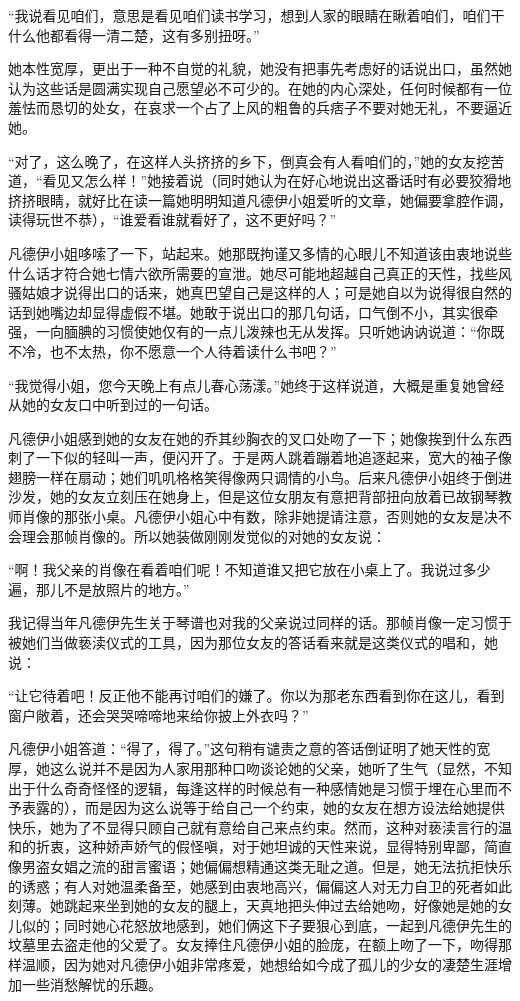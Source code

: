 \par “我说看见咱们，意思是看见咱们读书学习，想到人家的眼睛在瞅着咱们，咱们干什么他都看得一清二楚，这有多别扭呀。”
\par 她本性宽厚，更出于一种不自觉的礼貌，她没有把事先考虑好的话说出口，虽然她认为这些话是圆满实现自己愿望必不可少的。在她的内心深处，任何时候都有一位羞怯而恳切的处女，在哀求一个占了上风的粗鲁的兵痞子不要对她无礼，不要逼近她。
\par “对了，这么晚了，在这样人头挤挤的乡下，倒真会有人看咱们的，”她的女友挖苦道，“看见又怎么样！”她接着说（同时她认为在好心地说出这番话时有必要狡猾地挤挤眼睛，就好比在读一篇她明明知道凡德伊小姐爱听的文章，她偏要拿腔作调，读得玩世不恭），“谁爱看谁就看好了，这不更好吗？”
\par 凡德伊小姐哆嗦了一下，站起来。她那既拘谨又多情的心眼儿不知道该由衷地说些什么话才符合她七情六欲所需要的宣泄。她尽可能地超越自己真正的天性，找些风骚姑娘才说得出口的话来，她真巴望自己是这样的人；可是她自以为说得很自然的话到她嘴边却显得虚假不堪。她敢于说出口的那几句话，口气倒不小，其实很牵强，一向腼腆的习惯使她仅有的一点儿泼辣也无从发挥。只听她讷讷说道：“你既不冷，也不太热，你不愿意一个人待着读什么书吧？”
\par “我觉得小姐，您今天晚上有点儿春心荡漾。”她终于这样说道，大概是重复她曾经从她的女友口中听到过的一句话。
\par 凡德伊小姐感到她的女友在她的乔其纱胸衣的叉口处吻了一下；她像挨到什么东西刺了一下似的轻叫一声，便闪开了。于是两人跳着蹦着地追逐起来，宽大的袖子像翅膀一样在扇动；她们叽叽格格笑得像两只调情的小鸟。后来凡德伊小姐终于倒进沙发，她的女友立刻压在她身上，但是这位女朋友有意把背部扭向放着已故钢琴教师肖像的那张小桌。凡德伊小姐心中有数，除非她提请注意，否则她的女友是决不会理会那帧肖像的。所以她装做刚刚发觉似的对她的女友说：
\par “啊！我父亲的肖像在看着咱们呢！不知道谁又把它放在小桌上了。我说过多少遍，那儿不是放照片的地方。”
\par 我记得当年凡德伊先生关于琴谱也对我的父亲说过同样的话。那帧肖像一定习惯于被她们当做亵渎仪式的工具，因为那位女友的答话看来就是这类仪式的唱和，她说：
\par “让它待着吧！反正他不能再讨咱们的嫌了。你以为那老东西看到你在这儿，看到窗户敞着，还会哭哭啼啼地来给你披上外衣吗？”
\par 凡德伊小姐答道：“得了，得了。”这句稍有谴责之意的答话倒证明了她天性的宽厚，她这么说并不是因为人家用那种口吻谈论她的父亲，她听了生气（显然，不知出于什么奇奇怪怪的逻辑，每逢这样的时候总有一种感情她是习惯于埋在心里而不予表露的），而是因为这么说等于给自己一个约束，她的女友在想方设法给她提供快乐，她为了不显得只顾自己就有意给自己来点约束。然而，这种对亵渎言行的温和的折衷，这种娇声娇气的假怪嗔，对于她坦诚的天性来说，显得特别卑鄙，简直像男盗女娼之流的甜言蜜语；她偏偏想精通这类无耻之道。但是，她无法抗拒快乐的诱惑；有人对她温柔备至，她感到由衷地高兴，偏偏这人对无力自卫的死者如此刻薄。她跳起来坐到她的女友的腿上，天真地把头伸过去给她吻，好像她是她的女儿似的；同时她心花怒放地感到，她们俩这下子要狠心到底，一起到凡德伊先生的坟墓里去盗走他的父爱了。女友捧住凡德伊小姐的脸庞，在额上吻了一下，吻得那样温顺，因为她对凡德伊小姐非常疼爱，她想给如今成了孤儿的少女的凄楚生涯增加一些消愁解忧的乐趣。
